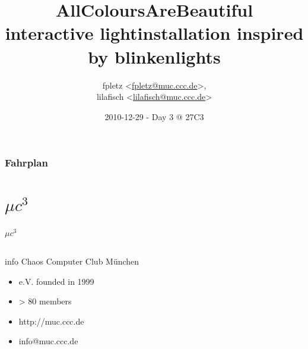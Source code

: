\documentclass{beamer}
\title[AllColoursAreBeautiful]{AllColoursAreBeautiful\\ interactive lightinstallation inspired by blinkenlights}
\author[fpletz, lilafisch]{fpletz <\url{fpletz@muc.ccc.de}>,\\ lilafisch <\url{lilafisch@muc.ccc.de}>}
\institute[$\mu c^{3}$]{$\mu c^{3}$ - CCC Munich }
\date{2010-12-29 - Day 3 @ 27C3}
\begin{document}
\begin{frame}
\titlepage
\end{frame}

\begin{frame}
\frametitle{Fahrplan}
\tableofcontents
\end{frame}
\setlength\fboxsep{5pt}
\setlength\fboxrule{0pt}
\section{$\mu c^{3}$}
  \begin{frame}{$\mu c^{3}$}
    \begin{columns}%
      \begin{column}{5cm}
        \begin{block}{info}
         Chaos Computer Club M\"unchen
               \begin{itemize}
            \item e.V. founded in 1999
            \item > 80 members
                  \item http://muc.ccc.de
                  \item info@muc.ccc.de
            \end{itemize}
        \end{block}


\end{column}
\end{columns}
\end{frame}
\end{document}
